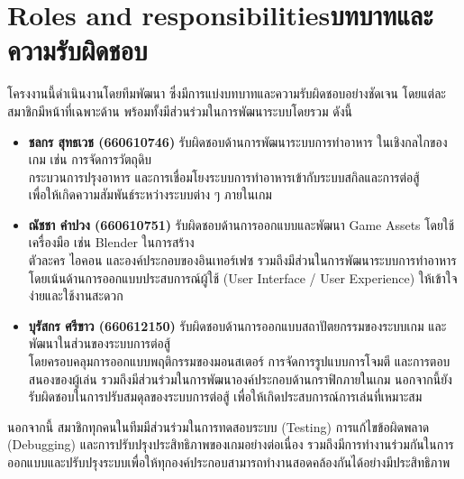\section{\ifenglish Roles and responsibilities\else บทบาทและความรับผิดชอบ\fi}

    \hspace{1.5em}โครงงานนี้ดำเนินงานโดยทีมพัฒนา ซึ่งมีการแบ่งบทบาทและความรับผิดชอบอย่างชัดเจน โดยแต่ละสมาชิกมีหน้าที่เฉพาะด้าน พร้อมทั้งมีส่วนร่วมในการพัฒนาระบบโดยรวม ดังนี้

    \begin{itemize}
        \item \textbf{ชลกร สุทธเวช (660610746)}\newline
        \hspace{1.5em}รับผิดชอบด้านการพัฒนาระบบการทำอาหาร ในเชิงกลไกของเกม เช่น การจัดการวัตถุดิบ \\กระบวนการปรุงอาหาร และการเชื่อมโยงระบบการทำอาหารเข้ากับระบบสกิลและการต่อสู้ \\เพื่อให้เกิดความสัมพันธ์ระหว่างระบบต่าง ๆ ภายในเกม
        \item \textbf{ณัชชา คำปวง (660610751)}\newline
        \hspace{1.5em}รับผิดชอบด้านการออกแบบและพัฒนา Game Assets โดยใช้เครื่องมือ เช่น Blender ในการสร้าง\\ตัวละคร ไอคอน และองค์ประกอบของอินเทอร์เฟซ รวมถึงมีส่วนในการพัฒนาระบบการทำอาหาร \\โดยเน้นด้านการออกแบบประสบการณ์ผู้ใช้ (User Interface / User Experience) ให้เข้าใจง่ายและใช้งานสะดวก
        \item \textbf{บุรัสกร ศรีขาว (660612150)}\newline
        \hspace{1.5em}รับผิดชอบด้านการออกแบบสถาปัตยกรรมของระบบเกม และพัฒนาในส่วนของระบบการต่อสู้ \\โดยครอบคลุมการออกแบบพฤติกรรมของมอนสเตอร์ การจัดการรูปแบบการโจมตี 
        และการตอบสนองของผู้เล่น รวมถึงมีส่วนร่วมในการพัฒนาองค์ประกอบด้านกราฟิกภายในเกม นอกจากนี้ยังรับผิดชอบในการปรับสมดุลของระบบการต่อสู้ เพื่อให้เกิดประสบการณ์การเล่นที่เหมาะสม
    \end{itemize}

    นอกจากนี้ สมาชิกทุกคนในทีมมีส่วนร่วมในการทดสอบระบบ (Testing) การแก้ไขข้อผิดพลาด \\(Debugging) และการปรับปรุงประสิทธิภาพของเกมอย่างต่อเนื่อง รวมถึงมีการทำงานร่วมกันในการ\\ออกแบบและปรับปรุงระบบเพื่อให้ทุกองค์ประกอบสามารถทำงานสอดคล้องกันได้อย่างมีประสิทธิภาพ

